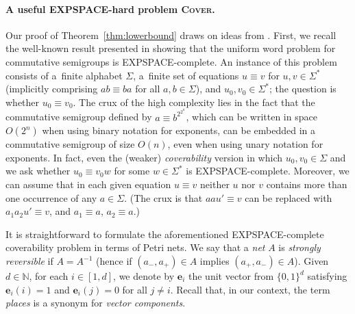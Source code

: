 \documentclass[11pt,a4paper]{amsart}
\newcommand{\Cover}{\textsc{Cover}\xspace}
\newcommand{\EXPSPACE}{EXPSPACE}
\newcommand{\Nat}{\mathbb{N}}
\newcommand{\setN}{\Nat}
\let\origtextsc\textsc
\renewcommand{\textsc}[1]{\textnormal{\origtextsc{#1}}}
\theoremstyle{plain}
\theoremstyle{definition}
\theoremstyle{defC}
\theoremstyle{thmC}
\begin{document}
\paragraph{A useful \EXPSPACE-hard problem \Cover.}
Our proof of Theorem~\ref{thm:lowerbound} draws on ideas from
\cite{DBLP:journals/acta/JancarP19}. First, we recall the
well-known result presented in \cite{mayr1982complexity}
showing that the uniform word problem for commutative
semigroups 
is \EXPSPACE-complete. An instance of this
problem consists of a~finite alphabet $\Sigma$, a~finite set
of equations $u\equiv v$ for $u,v\in\Sigma^*$ (implicitly
comprising $ab\equiv ba$ for all $a,b\in\Sigma$), and
$u_0,v_0\in\Sigma^*$; the question is whether $u_0\equiv v_0$.
The crux of the high complexity lies in the fact that the
commutative semigroup defined by $a\equiv b^{2^{2^n}}$,
which can be written in space $O(2^n)$ when using binary
notation for exponents, can be embedded in a commutative
semigroup of size $O(n)$, even when using unary notation for
exponents. In fact, even the (weaker) \emph{coverability}
version in which $u_0,v_0\in\Sigma$ and we ask whether
$u_0\equiv v_0w$ for some $w\in\Sigma^*$ is
\EXPSPACE-complete. 
Moreover, we can assume that 
in each given equation $u\equiv v$ neither $u$ nor $v$
contains more than one occurrence of any $a \in \Sigma$.
(The crux is that $aau'\equiv v$ can be replaced with  
$a_1a_2u' \equiv v$, and $a_1 \equiv
a$, $a_2 \equiv a$.)

It is straightforward to formulate the aforementioned \EXPSPACE-complete
coverability problem in terms of Petri nets.
We say that a \emph{net} $A$ is
\emph{strongly reversible} if $A=A^{-1}$
(hence if $(a_-,a_+) \in A$ implies $(a_+,a_-) \in A$).
Given $d\in\setN$, for each $i\in[1,d]$, we denote by $\mathbf{e}_i$ the
unit vector from $\{0,1\}^d$ satisfying 
$\mathbf{e}_i(i)=1$ and $\mathbf{e}_{i}(j)=0$ for all
$j\neq i$.
Recall that, in our context, the term \emph{places} is a synonym for \emph{vector components}.
\end{document}

